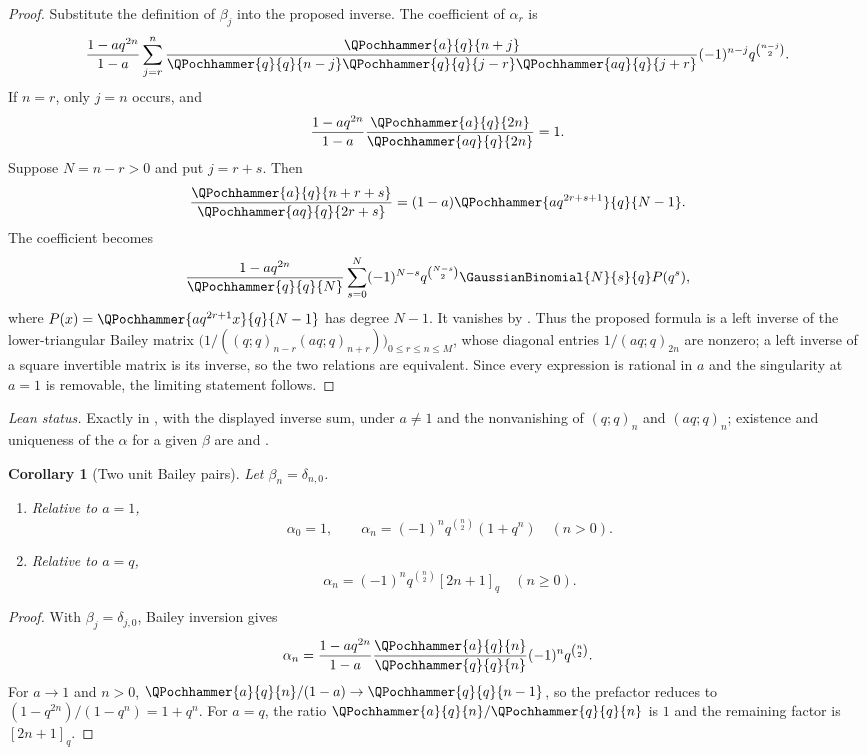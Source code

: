 \documentclass[11pt,a4paper,oneside,openany]{book}
\newtheorem{corollary}[corollary]{Corollary}
\theoremstyle{definition}
\theoremstyle{remark}
\begin{document}
\begin{proof}
Substitute the definition of $\beta_j$ into the proposed inverse.  The coefficient of $\alpha_r$ is
\[
 \frac{1-aq^{2n}}{1-a}
 \sum_{j=r}^{n}
 \frac{\QPochhammer{a}{q}{n+j}}
      {\QPochhammer{q}{q}{n-j}\QPochhammer{q}{q}{j-r}
       \QPochhammer{aq}{q}{j+r}}
 (-1)^{n-j}q^{\binom{n-j}{2}}.
\]
If $n=r$, only $j=n$ occurs, and
\[
 \frac{1-aq^{2n}}{1-a}
 \frac{\QPochhammer{a}{q}{2n}}{\QPochhammer{aq}{q}{2n}}=1.
\]
Suppose $N=n-r>0$ and put $j=r+s$.  Then
\[
 \frac{\QPochhammer{a}{q}{n+r+s}}{\QPochhammer{aq}{q}{2r+s}}
 =(1-a)\QPochhammer{aq^{2r+s+1}}{q}{N-1}.
\]
The coefficient becomes
\[
 \frac{1-aq^{2n}}{\QPochhammer{q}{q}{N}}
 \sum_{s=0}^{N}(-1)^{N-s}q^{\binom{N-s}{2}}
 \GaussianBinomial{N}{s}{q} P(q^s),
\]
where
\(
 P(x)=\QPochhammer{aq^{2r+1}x}{q}{N-1}
\)
has degree $N-1$.  It vanishes by .  Thus the proposed formula is a
left inverse of the lower-triangular Bailey matrix
$\bigl(1/((q;q)_{n-r}(aq;q)_{n+r})\bigr)_{0\le r\le n\le M}$, whose diagonal
entries $1/(aq;q)_{2n}$ are nonzero; a left inverse of a square invertible
matrix is its inverse, so the two relations are equivalent.
Since every expression is rational in $a$ and the singularity at $a=1$ is removable, the limiting statement follows.
\end{proof}

\emph{Lean status.}  Exactly  in
, with  the displayed inverse sum, under
$a\ne1$ and the nonvanishing of $(q;q)_n$ and $(aq;q)_n$; existence and uniqueness of the
$\alpha$ for a given $\beta$ are  and
.


\begin{corollary}[Two unit Bailey pairs]\label{cor:unit-bailey-pairs}
Let $\beta_n=\delta_{n,0}$.
\begin{enumerate}[label=\textup{(\roman*)}]
\item Relative to $a=1$,
\[
 \alpha_0=1,
 \qquad
 \alpha_n=(-1)^nq^{\binom n2}(1+q^n)\quad(n>0).
\]
\item Relative to $a=q$,
\[
 \alpha_n=(-1)^nq^{\binom n2}[2n+1]_q\quad(n\ge0).
\]
\end{enumerate}
\end{corollary}

\begin{proof}
With $\beta_j=\delta_{j,0}$, Bailey inversion gives
\[
 \alpha_n=\frac{1-aq^{2n}}{1-a}
 \frac{\QPochhammer{a}{q}{n}}{\QPochhammer{q}{q}{n}}
 (-1)^nq^{\binom n2}.
\]
For $a\to1$ and $n>0$,
$\QPochhammer{a}{q}{n}/(1-a)\to\QPochhammer{q}{q}{n-1}$,
so the prefactor reduces to
\(
 (1-q^{2n})/(1-q^n)=1+q^n.
\)
For $a=q$, the ratio
$\QPochhammer{a}{q}{n}/\QPochhammer{q}{q}{n}$ is $1$ and the remaining
factor is $[2n+1]_q$.
\end{proof}
\end{document}
